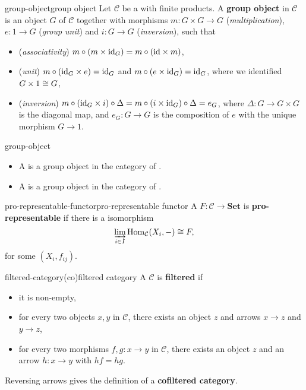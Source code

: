 \begin{topic}{group-object}{group object}
    Let $\mathcal{C}$ be a  with finite products. A \textbf{group object} in $\mathcal{C}$ is an object $G$ of $\mathcal{C}$ together with morphisms $m \colon G \times G \to G$ (\textit{multiplication}), $e \colon 1 \to G$ (\textit{group unit}) and $i \colon G \to G$ (\textit{inversion}), such that
    \begin{itemize}
        \item (\textit{associativity}) $m \circ (m \times \textup{id}_G) = m \circ (\textup{id} \times m)$,
        \item (\textit{unit}) $m \circ (\textup{id}_G \times e) = \textup{id}_G$ and $m \circ (e \times \textup{id}_G) = \textup{id}_G$, where we identified $G \times 1 \cong G$,
        \item (\textit{inversion}) $m \circ (\textup{id}_G \times i) \circ \Delta = m \circ (i \times \textup{id}_G) \circ \Delta = e_G$, where $\Delta \colon G \to G \times G$ is the diagonal map, and $e_G \colon G \to G$ is the composition of $e$ with the unique morphism $G \to 1$.
    \end{itemize}
\end{topic}

\begin{example}{group-object}
    \begin{itemize}
        \item A  is a group object in the category of .
        \item A  is a group object in the category of .
    \end{itemize}
\end{example}

\begin{topic}{pro-representable-functor}{pro-representable functor}
    A  $F \colon \mathcal{C} \to \textbf{Set}$ is \textbf{pro-representable} if there is a  isomorphism
    \[ \varinjlim_{i \in I} \operatorname{Hom}_\mathcal{C}(X_i, -) \cong F , \]
    for some  $(X_i, f_{ij})$.
\end{topic}

\begin{topic}{filtered-category}{(co)filtered category}
    A  $\mathcal{C}$ is \textbf{filtered} if
    \begin{itemize}
        \item it is non-empty,
        \item for every two objects $x, y$ in $\mathcal{C}$, there exists an object $z$ and arrows $x \to z$ and $y \to z$,
        \item for every two morphisms $f, g \colon x \to y$ in $\mathcal{C}$, there exists an object $z$ and an arrow $h \colon x \to y$ with $hf = hg$.
    \end{itemize}
    Reversing arrows gives the definition of a \textbf{cofiltered category}.
\end{topic}

